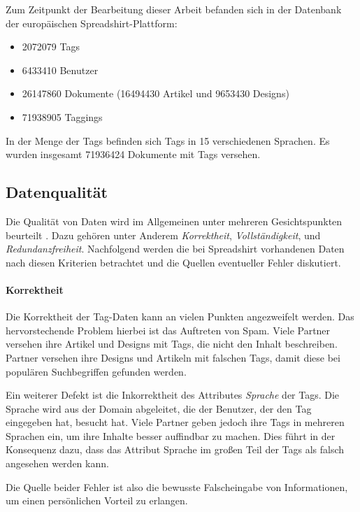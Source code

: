 Zum Zeitpunkt der Bearbeitung dieser Arbeit befanden sich in der Datenbank der europäischen Spreadshirt-Plattform:

\begin{itemize}
    \item \num{2072079} Tags
    \item \num{6433410} Benutzer
    \item \num{26147860} Dokumente (\num{16494430} Artikel und \num{9653430} Designs)
    \item \num{71938905} Taggings
\end{itemize}

In der Menge der Tags befinden sich Tags in \num{15} verschiedenen Sprachen. Es wurden insgesamt \num{71936424} Dokumente mit Tags versehen.

\subsection{Datenqualität}
\label{quality}

Die Qualität von Daten wird im Allgemeinen unter mehreren Gesichtspunkten beurteilt \cite{hkp2012}. Dazu gehören unter Anderem \emph{Korrektheit}, \emph{Vollständigkeit}, und \emph{Redundanzfreiheit}. Nachfolgend werden die bei Spreadshirt vorhandenen Daten nach diesen Kriterien betrachtet und die Quellen eventueller Fehler \cite[43 ff]{jo2003} diskutiert.

\paragraph{Korrektheit}

Die Korrektheit der Tag-Daten kann an vielen Punkten angezweifelt werden. Das hervorstechende Problem hierbei ist das Auftreten von Spam. Viele Partner versehen ihre Artikel und Designs mit Tags, die nicht den Inhalt beschreiben. Partner versehen ihre Designs und Artikeln mit falschen Tags, damit diese bei populären Suchbegriffen gefunden werden.

Ein weiterer Defekt ist die Inkorrektheit des Attributes \emph{Sprache} der Tags. Die Sprache wird aus der Domain abgeleitet, die der Benutzer, der den Tag eingegeben hat, besucht hat. Viele Partner geben jedoch ihre Tags in mehreren Sprachen ein, um ihre Inhalte besser auffindbar zu machen. Dies führt in der Konsequenz dazu, dass das Attribut Sprache im großen Teil der Tags als falsch angesehen werden kann.

Die Quelle beider Fehler ist also die bewusste Falscheingabe von Informationen, um einen persönlichen Vorteil zu erlangen.
                                                                                                                                                                                                                                                                                                                                                                                                              
